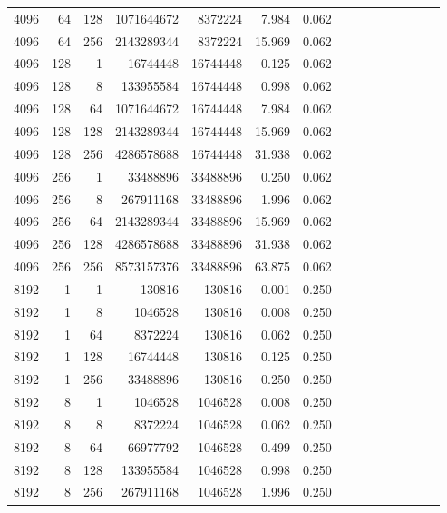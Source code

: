 \begin{longtable}{rrrrrrrrrrrrrrr}
4096 & 64 & 128 & 1071644672 & 8372224 & 7.984 & 0.062 &  &  &  &  &  &  &  & \\
4096 & 64 & 256 & 2143289344 & 8372224 & 15.969 & 0.062 &  &  &  &  &  &  &  & \\
4096 & 128 & 1 & 16744448 & 16744448 & 0.125 & 0.062 &  &  &  &  &  &  &  & \\
4096 & 128 & 8 & 133955584 & 16744448 & 0.998 & 0.062 &  &  &  &  &  &  &  & \\
4096 & 128 & 64 & 1071644672 & 16744448 & 7.984 & 0.062 &  &  &  &  &  &  &  & \\
4096 & 128 & 128 & 2143289344 & 16744448 & 15.969 & 0.062 &  &  &  &  &  &  &  & \\
4096 & 128 & 256 & 4286578688 & 16744448 & 31.938 & 0.062 &  &  &  &  &  &  &  & \\
4096 & 256 & 1 & 33488896 & 33488896 & 0.250 & 0.062 &  &  &  &  &  &  &  & \\
4096 & 256 & 8 & 267911168 & 33488896 & 1.996 & 0.062 &  &  &  &  &  &  &  & \\
4096 & 256 & 64 & 2143289344 & 33488896 & 15.969 & 0.062 &  &  &  &  &  &  &  & \\
4096 & 256 & 128 & 4286578688 & 33488896 & 31.938 & 0.062 &  &  &  &  &  &  &  & \\
4096 & 256 & 256 & 8573157376 & 33488896 & 63.875 & 0.062 &  &  &  &  &  &  &  & \\
8192 & 1 & 1 & 130816 & 130816 & 0.001 & 0.250 &  &  &  &  &  &  &  & \\
8192 & 1 & 8 & 1046528 & 130816 & 0.008 & 0.250 &  &  &  &  &  &  &  & \\
8192 & 1 & 64 & 8372224 & 130816 & 0.062 & 0.250 &  &  &  &  &  &  &  & \\
8192 & 1 & 128 & 16744448 & 130816 & 0.125 & 0.250 &  &  &  &  &  &  &  & \\
8192 & 1 & 256 & 33488896 & 130816 & 0.250 & 0.250 &  &  &  &  &  &  &  & \\
8192 & 8 & 1 & 1046528 & 1046528 & 0.008 & 0.250 &  &  &  &  &  &  &  & \\
8192 & 8 & 8 & 8372224 & 1046528 & 0.062 & 0.250 &  &  &  &  &  &  &  & \\
8192 & 8 & 64 & 66977792 & 1046528 & 0.499 & 0.250 &  &  &  &  &  &  &  & \\
8192 & 8 & 128 & 133955584 & 1046528 & 0.998 & 0.250 &  &  &  &  &  &  &  & \\
8192 & 8 & 256 & 267911168 & 1046528 & 1.996 & 0.250 &  &  &  &  &  &  &  & \\

\end{longtable}
